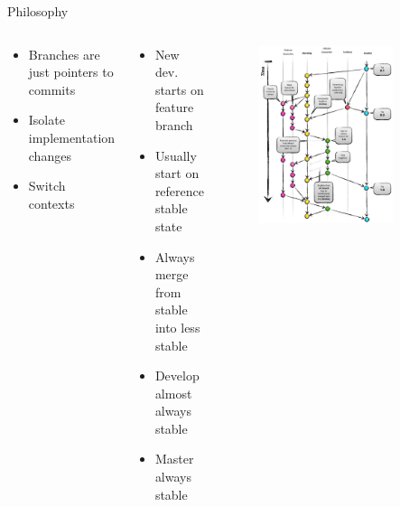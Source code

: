 \documentclass[compress,english,aspectratio=1610]{beamer}
\let\olditem\item
\renewcommand{\item}{\setlength{\itemsep}{\fill}\olditem}
\begin{document}
\begin{frame}{Philosophy}
	\begin{columns}
		\begin{tcolorbox}[colback=mpg-gray,colframe=mpg-green,title=Branches]
			\begin{itemize}
				\item Branches are just pointers to commits
                \item Isolate implementation changes
				\item Switch contexts
			\end{itemize}
		\end{tcolorbox}
		\begin{tcolorbox}[colback=mpg-gray,colframe=mpg-green,title=Workflow]
			\begin{itemize}
				\item New dev. starts on feature branch
				\item Usually start on reference stable state
				\item Always merge from stable into less stable
				\item Develop almost always stable
				\item Master always stable
			\end{itemize}
		\end{tcolorbox}
		\begin{figure}
     		\includegraphics[width=0.8\textwidth]{figures/git-model.jpg}
    		\end{figure}
	\end{columns}
\end{frame}
\end{document}
